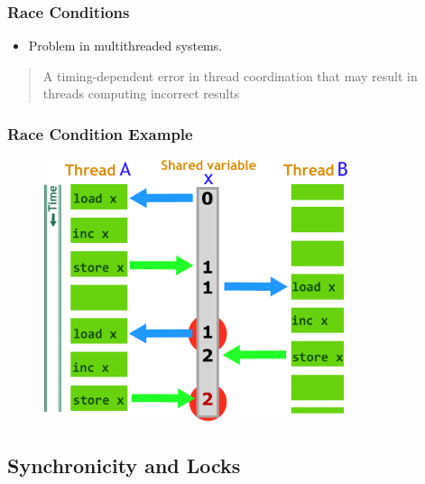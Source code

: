 \documentclass{beamer}
\newcommand{\linespace}{\vskip 0.25cm}
\begin{document}
\begin{frame}
\frametitle{Race Conditions}

\begin{itemize}
	\item Problem in multithreaded systems.
\end{itemize}

\linespace

\begin{quote}
A timing-dependent error in thread coordination that may result in threads computing incorrect results
\end{quote}

\end{frame}

\begin{frame}
\frametitle{Race Condition Example}
	\begin{figure}
		\includegraphics[width=0.8\textwidth]{Illustrations/RaceCondition}
		\label{fig:racecondition}
	\end{figure}

\end{frame}

\subsection[Locks]{Synchronicity and Locks}
\end{document}
